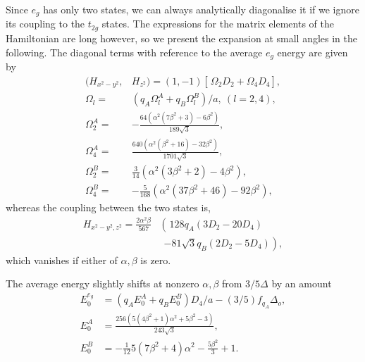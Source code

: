 \documentclass[a4paper,prb,twocolumn]{revtex4-1}  %
\newcommand{\com}[1]{}
\begin{document}
Since $e_{g}$ has only two states,
we can always analytically diagonalise it
if we
ignore its coupling to the $t_{2g}$ states.
The expressions for the
matrix elements of the Hamiltonian are long however,
so we present the expansion at small angles in the following.
The diagonal terms with reference to the average $e_g$ energy are given by
\begin{align}
\label{eq:eg-hiix}
(H_{x^2-y^2},&H_{z^2}) = (1,-1)
\left[\frac{}{} \Omega_{2}  D_2 + \Omega_4 D_4\right],\\
\Omega_{l} =&  \left(q_A \Omega_{l}^A + q_B\Omega_{l}^B\right)/a,~(l=2,4),\\
\Omega_{2}^A =&  -\frac{64 \left(\alpha ^2 \left(7 \beta ^2+3\right)-6 \beta ^2\right)}{189 \sqrt{3}},\\
\Omega_{4}^A =& \frac{640 \left(\alpha ^2 \left(\beta ^2+16\right)-32 \beta ^2\right)}{1701 \sqrt{3}},\\
\Omega_{2}^B =&  \frac{3}{14} \left(\alpha ^2 \left(3 \beta ^2+2\right)-4 \beta ^2\right),\\
\Omega_{4}^B =& -\frac{5}{168}\left(\alpha ^2 \left(37 \beta ^2+46\right)-92 \beta ^2\right),
\end{align}
whereas the coupling between the two states is,
\begin{align}
\nonumber
H_{x^2-y^2,z^2}=
\frac{2\alpha ^2 \beta}{567} 
&\left(\frac{}{}128 q_A (3 D_2-20 D_4) \right. \\ \label{eq:eg-hijx}
&~~\left. - 81 \sqrt{3} q_B (2 D_2 -5 D_4)\right),
\end{align}
which vanishes if 
either of $\alpha,\beta$ is zero.


The average energy slightly shifts at nonzero $\alpha,\beta$
from $3/5\Delta$ by an amount
\begin{align}
\label{eq:eg-E0}
E_0^{e_{g}} &= \left(q_A E_0^A +q_B E_0^B\right)D_4/a - (3/5)f_{q_A}\Delta_o,\\
E_0^A &=
\frac{256 \left(5 \left(4 \beta ^2+1\right) \alpha ^2+5 \beta ^2-3\right)}{243 \sqrt{3}},\\
E_0^B &=
-\frac{1}{12} 5 \left(7 \beta ^2+4\right) \alpha ^2-\frac{5 \beta ^2}{3}+1.
\end{align}


\com{
\begin{align}
H_{x^2-y^2,z^2}&=
\left[\frac{}{} \Lambda_{2}  D_2 + \Lambda_4 D_4\right],\\
\Lambda_{l} =&  \left(q_A \Lambda_{l}^A + q_B\Lambda_{l}^B\right)/a,~(l=2,4),\\
\Lambda_{2}^A =&
\frac{256 \alpha ^2 \beta }{189},\\
\Lambda_{4}^A =&
-\frac{1}{567} \left(5120 \alpha ^2 \beta \right),\\
\Lambda_{2}^B =&\frac{1}{7} (-4) \sqrt{3} \alpha ^2 \beta ,\\
\Lambda_{4}^B =&\frac{10}{7} \sqrt{3} \alpha ^2 \beta
\end{align}
}
\end{document}
